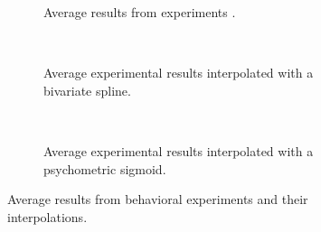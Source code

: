 \begin{multicols}{2}
\begin{figure}[H]
     \centering
    \begin{subfigure}[t]{0.41\textwidth}
        \centering
        
        \vspace{-\baselineskip}
        \caption{Average results from experiments \cite{MaryamPLACEHOLDER}.}
        \label{fig:exp-res}
    \end{subfigure}
    \\ \vspace{\baselineskip}
    \begin{subfigure}[t]{0.41\textwidth}
        \centering
        
        \vspace{-\baselineskip}
        \caption{Average experimental results interpolated with a bivariate spline.}
        \label{fig:exp-res-spline}
    \end{subfigure}
    \\ \vspace{\baselineskip}
    \begin{subfigure}[t]{0.41\textwidth}
        \centering
        
        \vspace{-\baselineskip}
        \caption{Average experimental results interpolated with a psychometric sigmoid.}
        \label{fig:exp-res-sigmoid}
    \end{subfigure}
    \caption[Experimental results]{Average results from behavioral experiments and their interpolations.}
    \label{fig:all-exp-res}
\end{figure}

\end{multicols}

\newpage

